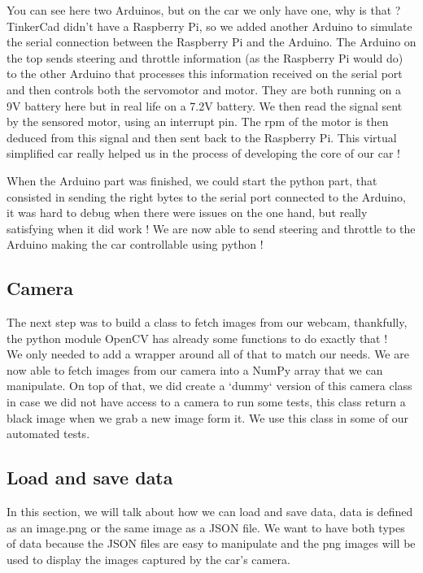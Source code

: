 \documentclass[12pt]{article}
\begin{document}
You can see here two Arduinos, but on the car we only have one, why is that ? TinkerCad didn't have a Raspberry Pi, so we added another Arduino to simulate the serial connection between the Raspberry Pi and the Arduino. The Arduino on the top sends steering and throttle information (as the Raspberry Pi would do) to the other Arduino that processes this information received on the serial port and then controls both the servomotor and motor. They are both running on a 9V battery here but in real life on a 7.2V battery. We then read the signal sent by the sensored motor, using an interrupt pin. The rpm of the motor is then deduced from this signal and then sent back to the Raspberry Pi.
This virtual simplified car really helped us in the process of developing the core of our car !

When the Arduino part was finished, we could start the python part, that consisted in sending the right bytes to the serial port connected to the Arduino, it was hard to debug when there were issues on the one hand, but really satisfying when it did work ! We are now able to send steering and throttle to the Arduino making the car controllable using python !

\subsection{Camera}
The next step was to build a class to fetch images from our webcam, thankfully, the python module OpenCV has already some functions to do exactly that ! \\
We only needed to add a wrapper around all of that to match our needs. We are now able to fetch images from our camera into a NumPy array that we can manipulate. On top of that, we did create a `dummy` version of this camera class in case we did not have access to a camera to run some tests, this class return a black image when we grab a new image form it. We use this class in some of our automated tests.

\subsection{Load and save data}
In this section, we will talk about how we can load and save data, data is defined as an image.png or the same image as a JSON file. We want to have both types of data because the JSON files are easy to manipulate and the png images will be used to display the images captured by the car's camera.\\
\end{document}
